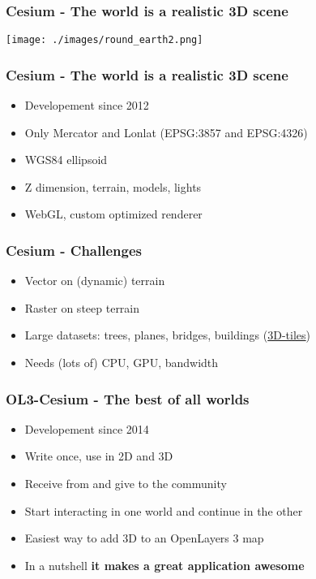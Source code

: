 \documentclass[presentation]{beamer}
\begin{document}
  \begin{frame}
    \frametitle{Cesium - The world is a realistic 3D scene}
    \begin{center}
     \texttt{[image: ./images/round\_earth2.png]}
    \end{center}
    \end{frame}


  \begin{frame}
    \frametitle{Cesium - The world is a realistic 3D scene}
    \begin{itemize}
      \item Developement since 2012
      \pause\item Only Mercator and Lonlat (EPSG:3857 and EPSG:4326)
      \pause\item WGS84 ellipsoid
      \pause\item Z dimension, terrain, models, lights
      \pause\item WebGL, custom optimized renderer
    \end{itemize}
  \end{frame}


  \begin{frame}
    \frametitle{Cesium - Challenges}
    \begin{itemize}
      \pause\item Vector on (dynamic) terrain
      \pause\item Raster on steep terrain
      \pause\item Large datasets: trees, planes, bridges, buildings (\href {https://github.com/AnalyticalGraphicsInc/3d-tiles}{3D-tiles})
      \pause\item Needs (lots of) CPU, GPU, bandwidth
    \end{itemize}

   \end{frame}


  \begin{frame}
    \frametitle{OL3-Cesium - The best of all worlds}
    \begin{itemize}
      \item Developement since 2014
      \pause\item Write once, use in 2D and 3D
      \pause\item Receive from and give to the community
      \pause\item Start interacting in one world and continue in the other
      \pause\item Easiest way to add 3D to an OpenLayers 3 map
      \pause\item In a nutshell \textbf{it makes a great application awesome}
    \end{itemize}
  \end{frame}
\end{document}

